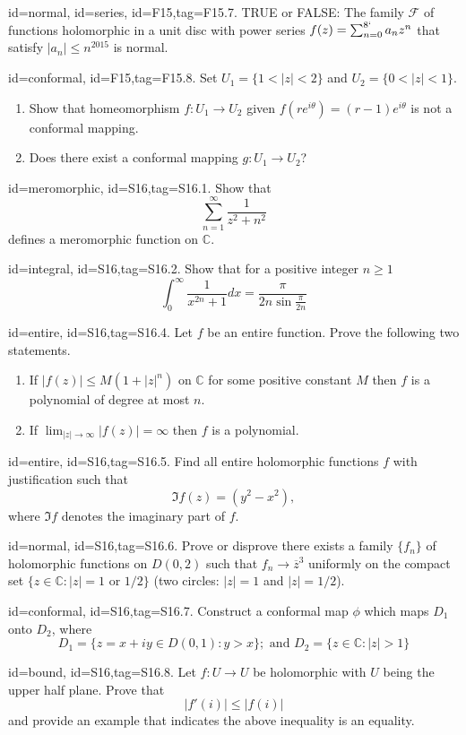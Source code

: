 \documentclass[12pt,letterpaper]{article}
\begin{document}
{\item[id=normal, id=series, id=F15,tag=F15.7.]
TRUE or FALSE: The family $\mathcal{F}$ of functions holomorphic in a unit disc with power series $f(z) = \sum_{n=0}^{8`} a_n z^n$ that satisfy $| a_n | \le n^{2015}$ is normal.

\item[id=conformal, id=F15,tag=F15.8.]
Set $U_1 = \{1 < | z | < 2\}$ and $U_2 = \{0 < | z | < 1\}$.
\begin{enumerate}[label=(\alph*)]\onlyitems
\item Show that homeomorphism $f : U_1 \rightarrow U_2$ given $f(re^{i\theta}) = (r-1)e^{i\theta}$ is not a conformal mapping.
\item Does there exist a conformal mapping $g : U_1 \rightarrow U_2$?
\end{enumerate}


\item[id=meromorphic, id=S16,tag=S16.1.]
Show that
\[
	\sum_{n=1}^{\infty} \frac{1}{z^2 + n^2}
\]
defines a meromorphic function on $\mathbb{C}$.
\item[id=integral, id=S16,tag=S16.2.]
Show that for a positive integer $n \ge 1$
\[
	\int_{0}^{\infty} \frac{1}{x^{2n} + 1} dx = \frac{\pi}{2n \sin \frac{\pi}{2n}}
\]
\item[id=entire, id=S16,tag=S16.4.]
Let $f$ be an entire function. Prove the following two statements.
\begin{enumerate}[label=(\alph*)]\onlyitems
\item If $| f(z) | \le M(1 + | z |^n)$ on $\mathbb{C}$ for some positive constant $M$ then $f$ is a polynomial of degree at most $n$.
\item If $\lim_{| z | \rightarrow \infty} | f(z) | = \infty$ then $f$ is a polynomial.
\end{enumerate}
\item[id=entire, id=S16,tag=S16.5.]
Find all entire holomorphic functions $f$ with justification such that
\[
	\Im f(z) = (y^2 - x^2),
\]
where $\Im f$ denotes the imaginary part of $f$.
\item[id=normal, id=S16,tag=S16.6.]
Prove or disprove there exists a family $\{f_n\}$ of holomorphic functions on $D(0,2)$ such that $f_n \rightarrow \overline{z}^3$ uniformly on the compact set $\{z \in \mathbb{C} \colon | z | = 1 \text{ or } 1/2 \}$ (two circles: $| z | = 1$ and $| z | = 1/2$).
\item[id=conformal, id=S16,tag=S16.7.]
Construct a conformal map $\phi$ which maps $D_1$ onto $D_2$, where
\[
	D_1 = \{z = x + iy \in D(0,1) \colon y > x \}; \text{ and } D_2 = \{z \in \mathbb{C} \colon | z | > 1\}
\]
\item[id=bound, id=S16,tag=S16.8.]
Let $f : U \rightarrow U$ be holomorphic with $U$ being the upper half plane. Prove that
\[
	| f'(i) | \le | f(i) |
\]
and provide an example that indicates the above inequality is an equality.

}
\end{document}
